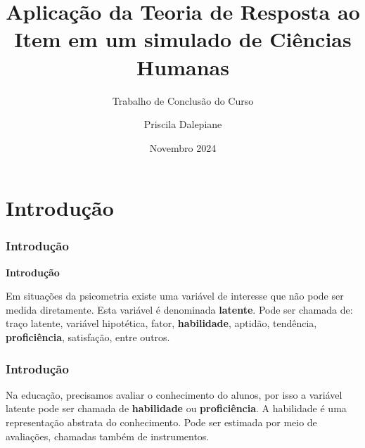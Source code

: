 \documentclass{beamer}
\title[TRI] %
{Aplicação da Teoria de Resposta ao Item em um simulado de Ciências Humanas}
\subtitle{Trabalho de Conclusão do Curso}
\author[Priscila] %
{Priscila Dalepiane}
\institute[UFMT] %
{
	
	Bacharelado em Estatística\\
	Universidade Federal de Mato Grosso
	
}
\date[2024] %
{Novembro 2024}
\begin{document}
	
	\frame{\titlepage}

	
\section{Introdução}
	
	\begin{frame}
		
		\frametitle{Introdução}

			\begin{center}
				\textbf{Introdução}
			\end{center}
			
		
			Em situações da psicometria existe uma variável de interesse que não pode ser medida diretamente. Esta variável é denominada \textbf{latente}.\newline \newline
			Pode ser chamada de: traço latente, variável hipotética, fator,  \textbf{habilidade}, aptidão, tendência, \textbf{proficiência}, satisfação, entre outros.
			
			 		
			
			\begin{figure}
			\end{figure}

		
 \end{frame}


\begin{frame}
		
		\frametitle{Introdução}

		
		Na educação, precisamos avaliar o conhecimento do alunos, por isso a variável latente pode ser chamada de \textbf{habilidade} ou \textbf{proficiência}. \newline
		A habilidade é uma representação abstrata do conhecimento.	\newline\newline
		Pode ser estimada por meio de avaliações, chamadas também de instrumentos.


		
		\begin{figure}
		\end{figure}	
		
			
\end{frame}
	
\end{document}
